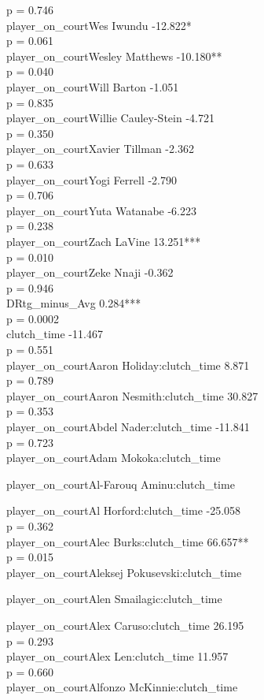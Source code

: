 \documentclass[
  landscape]{article}
\begin{document}
p = 0.746\\
player\_on\_courtWes Iwundu -12.822*\\
p = 0.061\\
player\_on\_courtWesley Matthews -10.180**\\
p = 0.040\\
player\_on\_courtWill Barton -1.051\\
p = 0.835\\
player\_on\_courtWillie Cauley-Stein -4.721\\
p = 0.350\\
player\_on\_courtXavier Tillman -2.362\\
p = 0.633\\
player\_on\_courtYogi Ferrell -2.790\\
p = 0.706\\
player\_on\_courtYuta Watanabe -6.223\\
p = 0.238\\
player\_on\_courtZach LaVine 13.251***\\
p = 0.010\\
player\_on\_courtZeke Nnaji -0.362\\
p = 0.946\\
DRtg\_minus\_Avg 0.284***\\
p = 0.0002\\
clutch\_time -11.467\\
p = 0.551\\
player\_on\_courtAaron Holiday:clutch\_time 8.871\\
p = 0.789\\
player\_on\_courtAaron Nesmith:clutch\_time 30.827\\
p = 0.353\\
player\_on\_courtAbdel Nader:clutch\_time -11.841\\
p = 0.723\\
player\_on\_courtAdam Mokoka:clutch\_time

player\_on\_courtAl-Farouq Aminu:clutch\_time

player\_on\_courtAl Horford:clutch\_time -25.058\\
p = 0.362\\
player\_on\_courtAlec Burks:clutch\_time 66.657**\\
p = 0.015\\
player\_on\_courtAleksej Pokusevski:clutch\_time

player\_on\_courtAlen Smailagic:clutch\_time

player\_on\_courtAlex Caruso:clutch\_time 26.195\\
p = 0.293\\
player\_on\_courtAlex Len:clutch\_time 11.957\\
p = 0.660\\
player\_on\_courtAlfonzo McKinnie:clutch\_time
\end{document}
